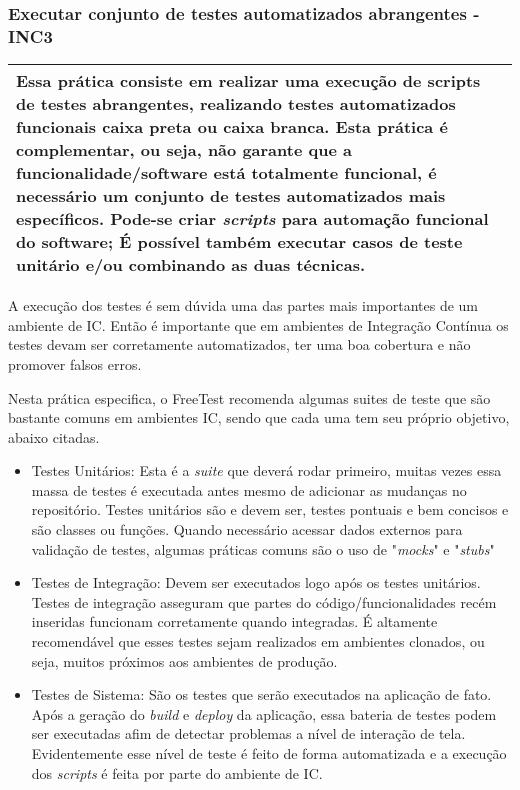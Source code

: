 \subsubsection{Executar conjunto de testes automatizados abrangentes - INC3}
\label{sec:inc3}

\begin{table}[H]
\centering
\begin{tabular}{|p{130mm}|}
\hline
Essa prática consiste em realizar uma execução de scripts de testes abrangentes, realizando testes automatizados funcionais caixa preta ou caixa branca. Esta prática é complementar, ou seja, não garante que a funcionalidade/software está totalmente funcional, é necessário um conjunto de testes automatizados mais específicos. Pode-se criar \textit{scripts} para automação funcional do software; É possível também executar casos de teste unitário e/ou combinando as duas técnicas. \\ 
\hline
\end{tabular}
\end{table}

A execução dos testes é sem dúvida uma das partes mais importantes de um ambiente de IC. Então é importante que em ambientes de Integração Contínua os testes devam ser corretamente automatizados, ter uma boa cobertura e não promover falsos erros.

Nesta prática especifica, o FreeTest recomenda algumas suites de teste que são bastante comuns em ambientes IC, sendo que cada uma tem seu próprio objetivo, abaixo citadas.

\begin{itemize}
	\item Testes Unitários: Esta é a \textit{suite} que deverá rodar primeiro, muitas vezes essa massa de testes é executada antes mesmo de adicionar as mudanças no repositório. Testes unitários são e devem ser, testes pontuais e bem concisos e são classes ou funções. Quando necessário acessar dados externos para validação de testes, algumas práticas comuns são o uso de "\textit{mocks}" e "\textit{stubs}"
	\item Testes de Integração: Devem ser executados logo após os testes unitários. Testes de integração asseguram que partes do código/funcionalidades recém inseridas funcionam corretamente quando integradas. É altamente recomendável que esses testes sejam realizados em ambientes clonados, ou seja, muitos próximos aos ambientes de produção.
	\item Testes de Sistema: São os testes que serão executados na aplicação de fato. Após a geração do \textit{build} e \textit{deploy} da aplicação, essa bateria de testes podem ser executadas afim de detectar problemas a nível de interação de tela. Evidentemente esse nível de teste é feito de forma automatizada e a execução dos \textit{scripts} é feita por parte do ambiente de IC.
\end{itemize}

